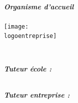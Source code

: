 {\begin{titlepage}
        {\scshape{} \filiere{} \\ \master{} \par}
        \vspace{1cm}

        {\large{} \annee{} \par}
        \vspace{1cm}

        {\large{} \dates{} \par}
        \vspace{1.5cm}

        \begin{minipage}[t]{0.4\textwidth}
            \begin{flushleft}
                \emph{\textbf{Organisme d'accueil}}\\
                \text{\nomentreprise}\\
                \texttt{[image: \\logoentreprise]} \\
            \end{flushleft}
        \end{minipage}
        ~
        \begin{minipage}[t]{0.4\textwidth}
            \begin{flushright}
                \emph{\textbf{Tuteur école :}} \\
                \tuteurecole{} \\
            \end{flushright}
            \begin{flushright}
                \emph{\textbf{Tuteur entreprise :}} \\
                \tuteurentreprise{} \\
            \end{flushright}
        \end{minipage}\\[2cm]

        \vfill{}


    \end{titlepage}
    \newpage{}
}

\newcommand{\tabledematieres}{
    \tableofcontents{}
    \newpage{}
}